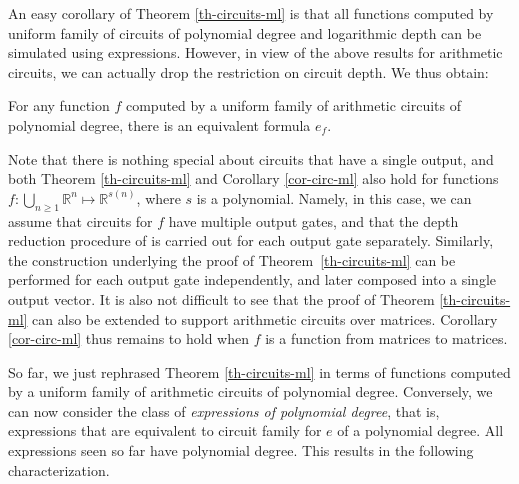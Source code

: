 
An easy corollary of Theorem \ref{th-circuits-ml} is that all functions computed by uniform family of circuits of polynomial degree and logarithmic depth can be simulated using \langfor expressions. However, in view of the above results for arithmetic circuits, we can actually drop the restriction on circuit depth.
We thus obtain:


\begin{corollary}
\label{cor-circ-ml}
For any function $f$ computed by a uniform family of arithmetic circuits of polynomial degree, there is an equivalent \langfor formula $e_f$.
\end{corollary}

Note that there is nothing special about circuits that have a single output, and both Theorem \ref{th-circuits-ml} and Corollary \ref{cor-circ-ml} also hold for functions  $f:\bigcup_{n\geq 1} \mathbb{R}^n\mapsto\mathbb{R}^{s(n)}$, where $s$ is a polynomial. Namely, in this case, we can assume that circuits for $f$ have multiple output gates, and that the depth reduction procedure of \cite{AllenderJMV98} is carried out for each output gate separately. Similarly, the construction underlying the proof of Theorem~\ref{th-circuits-ml} can be performed for each output gate independently, and later composed into a single output vector.
It is also  not difficult to see that the proof of Theorem \ref{th-circuits-ml} can also be extended to support arithmetic circuits over matrices. Corollary \ref{cor-circ-ml} thus remains to hold when $f$ is a function from matrices to matrices.


So far, we just rephrased  Theorem \ref{th-circuits-ml} in terms of functions computed by a uniform family of arithmetic circuits of polynomial degree.
Conversely, we can now consider the class of \textit{\langfor expressions of polynomial degree}, that is,  \langfor expressions that are equivalent to circuit family for $e$ of a polynomial degree.  All \langfor expressions seen so far have polynomial degree. This results in the following characterization.
%


